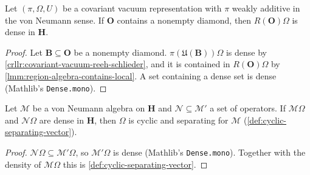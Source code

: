 \begin{lemma}
    \label{lmm:region-algebra-cyclic}
    \leanok
    Let $(\pi, \Omega, U)$ be a covariant vacuum representation with $\pi$ weakly additive in the von Neumann sense. If $\mathbf{O}$ contains a nonempty diamond, then $R(\mathbf{O})\Omega$ is dense in $\mathbf{H}$.
\end{lemma}
\begin{proof}
    \leanok
    Let $\mathbf{B} \subseteq \mathbf{O}$ be a nonempty diamond. $\pi(\mathfrak{U}(\mathbf{B}))\Omega$ is dense by \ref{crllr:covariant-vacuum-reeh-schlieder}, and it is contained in $R(\mathbf{O})\Omega$ by \ref{lmm:region-algebra-contains-local}. A set containing a dense set is dense (Mathlib's \texttt{Dense.mono}).
\end{proof}

\begin{lemma}
    \label{lmm:cyclic-separating-of-commutant}
    \leanok
    Let $\mathcal{M}$ be a von Neumann algebra on $\mathbf{H}$ and $\mathcal{N} \subseteq \mathcal{M}'$ a set of operators. If $\mathcal{M}\Omega$ and $\mathcal{N}\Omega$ are dense in $\mathbf{H}$, then $\Omega$ is cyclic and separating for $\mathcal{M}$ (\ref{def:cyclic-separating-vector}).
\end{lemma}
\begin{proof}
    \leanok
    $\mathcal{N}\Omega \subseteq \mathcal{M}'\Omega$, so $\mathcal{M}'\Omega$ is dense (Mathlib's \texttt{Dense.mono}). Together with the density of $\mathcal{M}\Omega$ this is \ref{def:cyclic-separating-vector}.
\end{proof}

